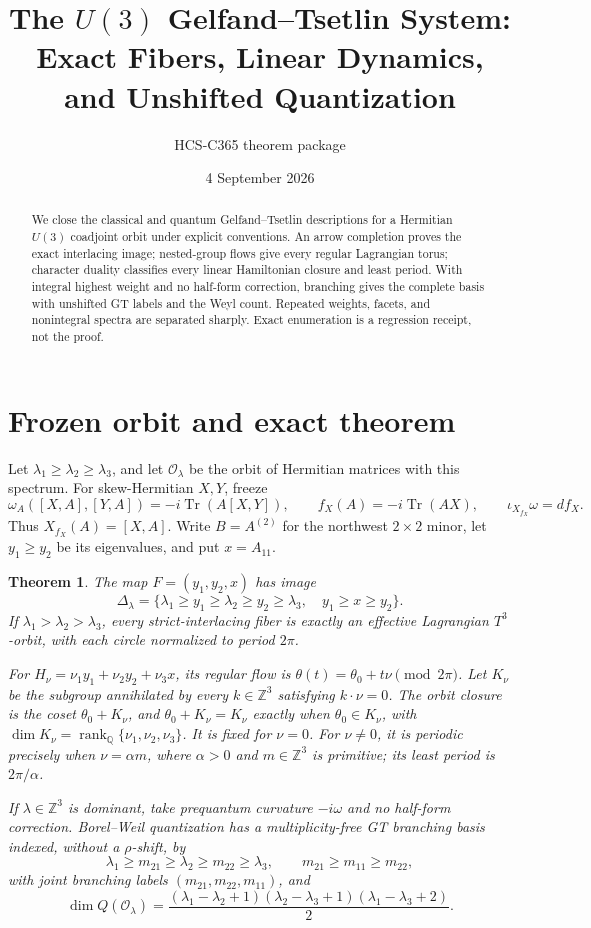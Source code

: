 \documentclass[10pt]{article}
\title{The \(U(3)\) Gelfand--Tsetlin System:\\Exact Fibers, Linear Dynamics, and Unshifted Quantization}
\author{HCS-C365 theorem package}
\date{4 September 2026}
\newcommand{\Orb}{\mathcal O}
\newcommand{\ZZ}{\mathbb Z}
\newtheorem{theorem}{Theorem}
\begin{document}
\maketitle
\begin{abstract}
We close the classical and quantum Gelfand--Tsetlin descriptions for a Hermitian $U(3)$ coadjoint orbit under explicit conventions.  An arrow completion proves the exact interlacing image; nested-group flows give every regular Lagrangian torus; character duality classifies every linear Hamiltonian closure and least period.  With integral highest weight and no half-form correction, branching gives the complete basis with unshifted GT labels and the Weyl count.  Repeated weights, facets, and nonintegral spectra are separated sharply.  Exact enumeration is a regression receipt, not the proof.
\end{abstract}

\section{Frozen orbit and exact theorem}
Let $\lambda_1\geq\lambda_2\geq\lambda_3$, and let $\Orb_\lambda$ be the orbit of Hermitian matrices with this spectrum.  For skew-Hermitian $X,Y$, freeze
\[
 \omega_A([X,A],[Y,A])=-i\operatorname{Tr}(A[X,Y]),\qquad
 f_X(A)=-i\operatorname{Tr}(AX),\qquad \iota_{X_{f_X}}\omega=df_X.
\]
Thus $X_{f_X}(A)=[X,A]$.  Write $B=A^{(2)}$ for the northwest $2\times2$ minor, let $y_1\geq y_2$ be its eigenvalues, and put $x=A_{11}$.

\begin{theorem}\label{thm:main}
The map $F=(y_1,y_2,x)$ has image
\[
 \Delta_\lambda=\{\lambda_1\geq y_1\geq\lambda_2\geq y_2\geq\lambda_3,
 \quad y_1\geq x\geq y_2\}.
\]
If $\lambda_1>\lambda_2>\lambda_3$, every strict-interlacing fiber is exactly an effective Lagrangian $T^3$-orbit, with each circle normalized to period $2\pi$.

For $H_\nu=\nu_1y_1+\nu_2y_2+\nu_3x$, its regular flow is
$\theta(t)=\theta_0+t\nu\pmod {2\pi}$.  Let $K_\nu$ be the subgroup annihilated by every $k\in\ZZ^3$ satisfying $k\cdot\nu=0$.  The orbit closure is the coset $\theta_0+K_\nu$, and $\theta_0+K_\nu=K_\nu$ exactly when $\theta_0\in K_\nu$, with
$\dim K_\nu=\operatorname{rank}_{\mathbb Q}\{\nu_1,\nu_2,\nu_3\}$.  It is fixed for $\nu=0$.  For $\nu\ne0$, it is periodic precisely when $\nu=\alpha m$, where $\alpha>0$ and $m\in\ZZ^3$ is primitive; its least period is $2\pi/\alpha$.

If $\lambda\in\ZZ^3$ is dominant, take prequantum curvature $-i\omega$ and no half-form correction.  Borel--Weil quantization has a multiplicity-free GT branching basis indexed, without a $\rho$-shift, by
\[
 \lambda_1\geq m_{21}\geq\lambda_2\geq m_{22}\geq\lambda_3,
 \qquad m_{21}\geq m_{11}\geq m_{22},
\]
with joint branching labels $(m_{21},m_{22},m_{11})$, and
\[
 \dim Q(\Orb_\lambda)=
 \frac{(\lambda_1-\lambda_2+1)(\lambda_2-\lambda_3+1)
 (\lambda_1-\lambda_3+2)}2.
\]
\end{theorem}
\end{document}
